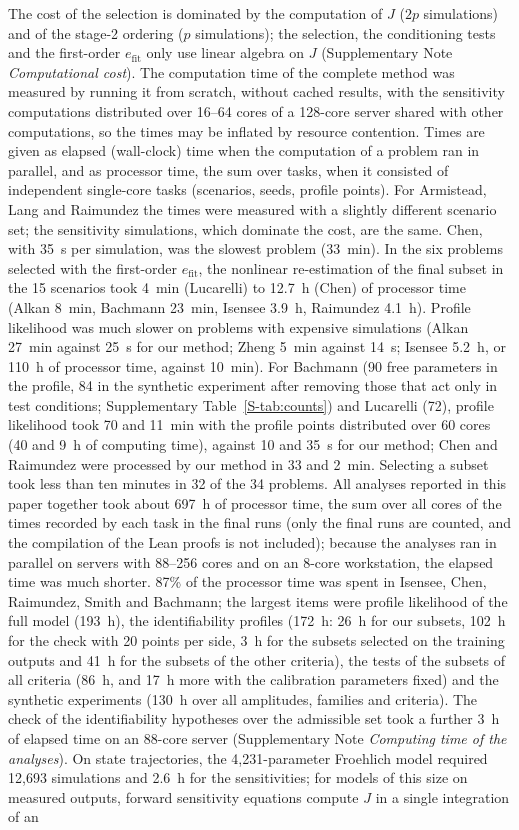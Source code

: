 \documentclass[pdflatex,sn-nature]{sn-jnl}
\theoremstyle{plain}
\begin{document}
The cost of the selection is dominated by the computation of $J$ ($2p$ simulations) and of the stage-2 ordering ($p$ simulations); the selection, the conditioning tests and the first-order $e_{\mathrm{fit}}$ only use linear algebra on $J$ (Supplementary Note \textit{Computational cost}). The computation time of the complete method was measured by running it from scratch, without cached results, with the sensitivity computations distributed over 16--64 cores of a 128-core server shared with other computations, so the times may be inflated by resource contention. Times are given as elapsed (wall-clock) time when the computation of a problem ran in parallel, and as processor time, the sum over tasks, when it consisted of independent single-core tasks (scenarios, seeds, profile points). For Armistead, Lang and Raimundez the times were measured with a slightly different scenario set; the sensitivity simulations, which dominate the cost, are the same. Chen, with 35~s per simulation, was the slowest problem (33~min). In the six problems selected with the first-order $e_{\mathrm{fit}}$, the nonlinear re-estimation of the final subset in the 15 scenarios took 4~min (Lucarelli) to 12.7~h (Chen) of processor time (Alkan 8~min, Bachmann 23~min, Isensee 3.9~h, Raimundez 4.1~h). Profile likelihood was much slower on problems with expensive simulations (Alkan 27~min against 25~s for our method; Zheng 5~min against 14~s; Isensee 5.2~h, or 110~h of processor time, against 10~min). For Bachmann (90 free parameters in the profile, 84 in the synthetic experiment after removing those that act only in test conditions; Supplementary Table~\ref{S-tab:counts}) and Lucarelli (72), profile likelihood took 70 and 11~min with the profile points distributed over 60 cores (40 and 9~h of computing time), against 10 and 35~s for our method; Chen and Raimundez were processed by our method in 33 and 2~min. Selecting a subset took less than ten minutes in 32 of the 34 problems. All analyses reported in this paper together took about 697~h of processor time, the sum over all cores of the times recorded by each task in the final runs (only the final runs are counted, and the compilation of the Lean proofs is not included); because the analyses ran in parallel on servers with 88--256 cores and on an 8-core workstation, the elapsed time was much shorter. 87\% of the processor time was spent in Isensee, Chen, Raimundez, Smith and Bachmann; the largest items were profile likelihood of the full model (193~h), the identifiability profiles (172~h: 26~h for our subsets, 102~h for the check with 20 points per side, 3~h for the subsets selected on the training outputs and 41~h for the subsets of the other criteria), the tests of the subsets of all criteria (86~h, and 17~h more with the calibration parameters fixed) and the synthetic experiments (130~h over all amplitudes, families and criteria). The check of the identifiability hypotheses over the admissible set took a further 3~h of elapsed time on an 88-core server (Supplementary Note \textit{Computing time of the analyses}). On state trajectories, the 4,231-parameter Froehlich model required 12,693 simulations and 2.6~h for the sensitivities; for models of this size on measured outputs, forward sensitivity equations\cite{bib13} compute $J$ in a single integration of an 
\end{document}
